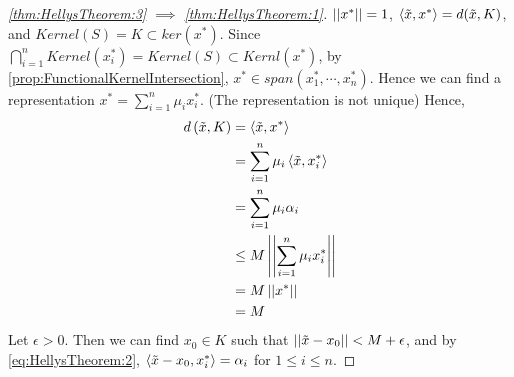 \begin{thm}
\begin{proof}[\ref{thm:HellysTheorem:3} $\implies$ \ref{thm:HellysTheorem:1}]
        $\left|\left| x^* \right|\right|=1$, 
        $\left\langle \tilde{x}, x^* \right\rangle = d(\tilde{x}, K)$, 
        and $Kernel(S) = K \subset ker(x^*)$. 
        Since $\bigcap\limits_{i=1}^n Kernel(x_i^*) =Kernel(S) \subset Kernl(x^*)$, 
        by \ref{prop:FunctionalKernelIntersection}, 
        $x^* \in span(x_1^*, \cdots, x_n^*)$. 
        Hence we can find a representation 
        $x^* = \sum\limits_{i=1}^n \mu_i x_i^*$. 
        (The representation is not unique)
        Hence, 
        \begin{align*}
           d\left( \tilde{x}, K\right) & = \left\langle \tilde{x}, x^* \right\rangle \\ 
           & = \sum\limits_{i=1}^n \mu_i \left\langle \tilde{x}, x_i^* \right\rangle\\
           & = \sum\limits_{i=1}^n \mu_i \alpha_i \\
           & \leq M \left|\left| \sum\limits_{i=1}^n \mu_i x_i^* \right|\right| \\
           & = M \left|\left| x^* \right|\right| \\
           & = M
        \end{align*}
        Let $\epsilon > 0$. 
        Then we can find $x_0 \in K$ such that $\left|\left| \tilde{x}-x_0 \right|\right| < M+\epsilon$, and 
        by \ref{eq:HellysTheorem:2}, 
        $\left\langle \tilde{x}-x_0, x_i^* \right\rangle = \alpha_i$ for $1 \leq i \leq n$. 
    \end{proof}
\end{thm}


